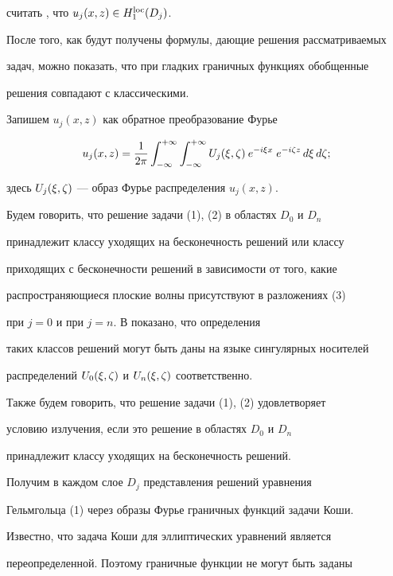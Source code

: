 считать \cite{IlSm.DEVPTE}, что $u_j(x,z)\in H_1^{\operatorname{loc}}(D_j)$.


После того, как будут получены формулы, дающие решения рассматриваемых


задач, можно показать, что при гладких граничных функциях обобщенные


решения совпадают с классическими.





Запишем $u_j(x,z)$ как обратное преобразование Фурье


\begin{equation}


u_j(x,z) = \frac{1}{2\pi}


\int_{-\infty}^{+\infty}\int_{-\infty}^{+\infty}


U_j(\xi,\dz)\: e^{-i\xi x}\;e^{-i\dz z}\, d\xi\, d\dz;


\end{equation}


здесь $U_j(\xi,\zeta)$ --- образ Фурье распределения $u_j(x,z)$.


Будем говорить, что решение задачи (1), (2) в областях $D_0$ и $D_n$


принадлежит классу уходящих на бесконечность решений или классу


приходящих с бесконечности решений в зависимости от того, какие


распространяющиеся плоские волны присутствуют в разложениях (3)


при $j=0$ и при $j=n$. В \cite{PNB.99.4} показано, что определения


таких классов решений могут быть даны на языке сингулярных носителей


распределений $U_0(\xi,\zeta)$ и $U_n(\xi,\zeta)$ соответственно.


Также будем говорить, что решение задачи (1), (2) удовлетворяет


условию излучения, если это решение в областях $D_0$ и $D_n$


принадлежит классу уходящих на бесконечность решений.





Получим в каждом слое $D_j$ представления решений уравнения


Гельмгольца (1) через образы Фурье граничных функций задачи Коши.


Известно, что задача Коши для эллиптических уравнений является


переопределенной. Поэтому граничные функции не могут быть заданы



